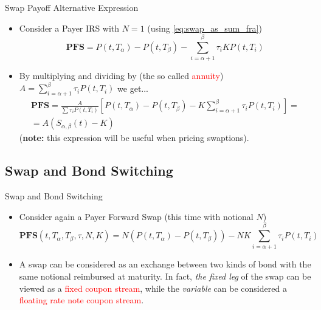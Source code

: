 \documentclass{beamer}
\begin{document}
\begin{frame}{Swap Payoff Alternative Expression}
	\begin{itemize}
		\item<1-> Consider a Payer IRS with $N=1$ (using \cref{eq:swap_as_sum_fra})
		\begin{equation*}
			\textbf{PFS} = P(t,T_\alpha)-P(t,T_\beta)-\sum_{i=\alpha+1}^{\beta}\tau_iKP(t,T_i)
		\end{equation*}
		\item<2-> By multiplying and dividing by (the so called \textcolor{red}{annuity}) $A = \sum_{i=\alpha+1}^{\beta}\tau_iP(t, T_i)$
		we get...
		\begin{equation}
			\begin{gathered}
			\textbf{PFS}=\frac{A}{\sum\tau_iP(t, T_i)}\left[P(t,T_\alpha)-P(t,T_\beta)-K\sum_{i=\alpha+1}^{\beta}\tau_i P(t,T_i)\right]=\\
			= A (S_{\alpha,\beta}(t)-K)
			\end{gathered}
		\label{eq:swap_payoff_with_swap_rate}
		\end{equation}
		(\textbf{note:} this expression will be useful when pricing swaptions).
	\end{itemize}
\end{frame}

\subsection{Swap and Bond Switching}
\begin{frame}{Swap and Bond Switching}
	\begin{itemize}
		\item<1-> Consider again a Payer Forward Swap (this time with notional $N$)
		\begin{equation*}
			\textbf{PFS}(t,T_\alpha,T_\beta,\tau,N,K)=N(P(t,T_\alpha)-P(t,T_\beta))-NK\sum_{i=\alpha+1}^{\beta} \tau_iP(t,T_i)
		\end{equation*}
		\item<2-> A swap can be considered as an exchange between two kinds of bond with the same notional reimbursed at maturity. In fact, \emph{the fixed leg} of the swap can be viewed as a \textcolor{red}{fixed coupon stream}, while the \emph{variable} can be considered a \textcolor{red}{floating rate note coupon stream}. 
	
	\end{itemize}
\end{frame}
\end{document}

